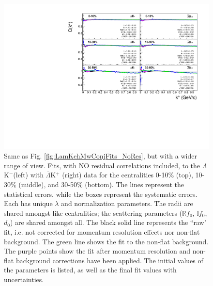 \documentclass[../AnalysisNoteJBuxton.tex]{subfiles}
\begin{document}
\begin{figure}[h]
  \centering
  \includegraphics[width=\textwidth]{7_ResultsAndDiscussion/Figures/canKStarCfwFitsLamKchMwConj_0010_1030_3050UnZoomed_MomResCrctn_NonFlatBgdCrctn.pdf}
  \caption[$\Lambda$K$^{-}$($\bar{\Lambda}$K$^{+}$) Fits with No Residuals (Wide Range)]{Same as Fig. \ref{fig:LamKchMwConjFits_NoRes}, but with a wider range of view.
Fits, with NO residual correlations included, to the $\Lambda$K$^{-}$(left) with $\bar{\Lambda}$K$^{+}$ (right) data for the centralities 0-10\% (top), 10-30\% (middle), and 30-50\% (bottom).
The lines represent the statistical errors, while the boxes represent the systematic errors.  
Each has unique $\lambda$ and normalization parameters.
The radii are shared amongst like centralities; the scattering parameters ($\mathbb{R}f_{0}$, $\mathbb{I}f_{0}$, $d_{0}$) are shared amongst all.
The black solid line represents the ``raw" fit, i.e. not corrected for momentum resolution effects nor non-flat background.  
The green line shows the fit to the non-flat background.
The purple points show the fit after momentum resolution and non-flat background corrections have been applied.
The initial values of the parameters is listed, as well as the final fit values with uncertainties.}
  \label{fig:LamKchMwConjFitsUnZoomed_NoRes}
\end{figure}
\end{document}

